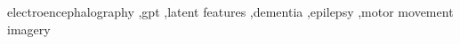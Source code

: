 \begin{keyword}
electroencephalography \sep gpt \sep latent features \sep dementia \sep epilepsy \sep motor movement imagery
\end{keyword}
